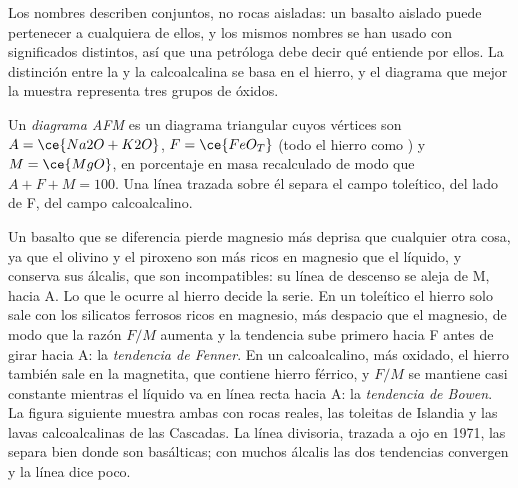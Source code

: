 Los nombres describen conjuntos, no rocas aisladas: un basalto aislado puede pertenecer a cualquiera de
ellos, y los mismos nombres se han usado con significados distintos, así que una petróloga
debe decir qué entiende por ellos. La distinción entre la  y la
calcoalcalina se basa en el hierro, y el diagrama que mejor la muestra representa tres
grupos de óxidos.

\begin{definition}\label{def:b2:magmatic-series:afm}
Un \emph{diagrama AFM} es un diagrama triangular cuyos vértices son
$A = \ce{Na2O + K2O}$, $F = \ce{FeO_T}$ (todo el hierro como ) y $M = \ce{MgO}$, en
porcentaje en masa recalculado de modo que $A + F + M = 100$. Una línea trazada sobre él separa el
campo toleítico, del lado de F, del campo calcoalcalino.
\end{definition}

Un basalto que se diferencia pierde magnesio más deprisa que cualquier otra cosa, ya que el olivino y el
piroxeno son más ricos en magnesio que el líquido, y conserva sus álcalis, que son
incompatibles: su línea de descenso se aleja de M, hacia A. Lo que le ocurre al
hierro decide la serie. En un  toleítico el hierro solo sale con los
silicatos ferrosos ricos en magnesio, más despacio que el magnesio, de modo que la razón
$F/M$ aumenta y la tendencia sube primero hacia F antes de girar hacia A: la
\emph{tendencia de Fenner}. En un  calcoalcalino, más oxidado, el hierro también sale en la
magnetita, que contiene hierro férrico, y $F/M$ se mantiene casi constante mientras el líquido
va en línea recta hacia A: la \emph{tendencia de Bowen}. La figura siguiente muestra ambas con
rocas reales, las toleitas de Islandia y las lavas calcoalcalinas de las Cascadas. La
línea divisoria, trazada a ojo en 1971, las separa bien donde son basálticas; con
muchos álcalis las dos tendencias convergen y la línea dice poco.

